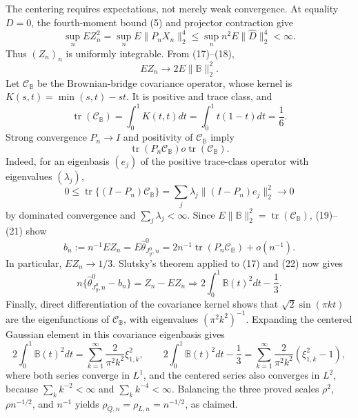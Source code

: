 The centering requires expectations, not merely weak convergence. At equality \(D=0\), the fourth-moment bound (5) and projector contraction give
\[
\sup_n E Z_n^2
=\sup_nE\|P_nX_n\|_2^4
\le\sup_n n^2E\|\widehat D\|_2^4<\infty. \tag{18}
\]
Thus \((Z_n)_n\) is uniformly integrable. From (17)--(18),
\[
EZ_n\longrightarrow2E\|\mathbb B\|_2^2. \tag{19}
\]
Let \(\mathcal C_{\mathbb B}\) be the Brownian-bridge covariance operator, whose kernel is \(K(s,t)=\min(s,t)-st\). It is positive and trace class, and
\[
\operatorname{tr}(\mathcal C_{\mathbb B})
=\int_0^1K(t,t)dt
=\int_0^1t(1-t)dt=\frac16. \tag{20}
\]
Strong convergence \(P_n\to I\) and positivity of \(\mathcal C_{\mathbb B}\) imply
\[
\operatorname{tr}(P_n\mathcal C_{\mathbb B})  o
\operatorname{tr}(\mathcal C_{\mathbb B}). \tag{21}
\]
Indeed, for an eigenbasis \((e_j)\) of the positive trace-class operator with eigenvalues \((\lambda_j)\),
\[
0\le\operatorname{tr}\{(I-P_n)\mathcal C_{\mathbb B}\}
=\sum_j\lambda_j\|(I-P_n)e_j\|_2^2\to0
\]
by dominated convergence and \(\sum_j\lambda_j<\infty\). Since \(E\|\mathbb B\|_2^2=\operatorname{tr}(\mathcal C_{\mathbb B})\), (19)--(21) show
\[
b_n:=n^{-1}EZ_n=E\widehat\theta^0_{J_y^0,n}
=2n^{-1}\operatorname{tr}(P_n\mathcal C_{\mathbb B})+o(n^{-1}). \tag{22}
\]
In particular, \(EZ_n\to1/3\). Slutsky's theorem applied to (17) and (22) now gives
\[
n\{\widehat\theta^0_{J_y^0,n}-b_n\}
=Z_n-EZ_n
\Rightarrow2\int_0^1\mathbb B(t)^2dt-\frac13. \tag{23}
\]
Finally, direct differentiation of the covariance kernel shows that \(\sqrt2\sin(\pi kt)\) are the eigenfunctions of \(\mathcal C_{\mathbb B}\), with eigenvalues \((\pi^2k^2)^{-1}\). Expanding the centered Gaussian element in this covariance eigenbasis gives
\[
2\int_0^1\mathbb B(t)^2dt
=\sum_{k=1}^{\infty}\frac{2}{\pi^2k^2}\xi_{1,k}^2,
\qquad
2\int_0^1\mathbb B(t)^2dt-\frac13
=\sum_{k=1}^{\infty}\frac{2}{\pi^2k^2}(\xi_{1,k}^2-1), \tag{24}
\]
where both series converge in \(L^1\), and the centered series also converges in \(L^2\), because \(\sum_k k^{-2}<\infty\) and \(\sum_k k^{-4}<\infty\). Balancing the three proved scales \(\rho^2\), \(\rho n^{-1/2}\), and \(n^{-1}\) yields \(\rho_{Q,n}=\rho_{L,n}=n^{-1/2}\), as claimed.